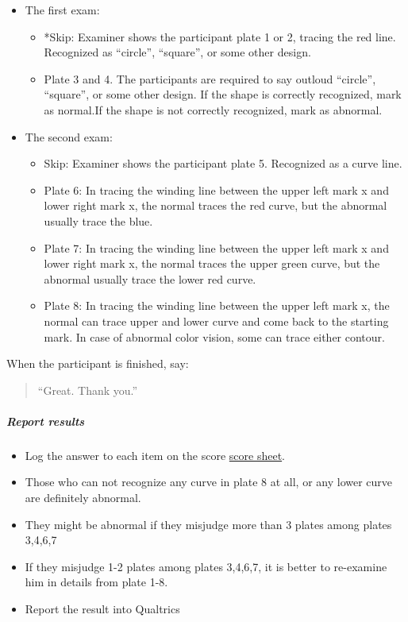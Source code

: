 \documentclass[]{article}
\providecommand{\tightlist}{%
  \setlength{\itemsep}{0pt}\setlength{\parskip}{0pt}}
\let\oldsubparagraph\subparagraph
\renewcommand{\subparagraph}[1]{\oldsubparagraph{#1}\mbox{}}
\begin{document}
\begin{itemize}
\tightlist
\item
  The first exam:

  \begin{itemize}
  \tightlist
  \item
    *Skip: Examiner shows the participant plate 1 or 2, tracing the red
    line. Recognized as ``circle'', ``square'', or some other design.
  \item
    Plate 3 and 4. The participants are required to say outloud
    ``circle'', ``square'', or some other design. If the shape is
    correctly recognized, mark as normal.If the shape is not correctly
    recognized, mark as abnormal.
  \end{itemize}
\item
  The second exam:

  \begin{itemize}
  \tightlist
  \item
    Skip: Examiner shows the participant plate 5. Recognized as a curve
    line.
  \item
    Plate 6: In tracing the winding line between the upper left mark x
    and lower right mark x, the normal traces the red curve, but the
    abnormal usually trace the blue.
  \item
    Plate 7: In tracing the winding line between the upper left mark x
    and lower right mark x, the normal traces the upper green curve, but
    the abnormal usually trace the lower red curve.
  \item
    Plate 8: In tracing the winding line between the upper left mark x,
    the normal can trace upper and lower curve and come back to the
    starting mark. In case of abnormal color vision, some can trace
    either contour.
  \end{itemize}
\end{itemize}

When the participant is finished, say:

\begin{quote}
``Great. Thank you.''
\end{quote}

\subparagraph{Report results}\label{report-results-1}

\begin{itemize}
\tightlist
\item
  Log the answer to each item on the score
  \href{vision-screening-score-sheet.html}{score sheet}.
\item
  Those who can not recognize any curve in plate 8 at all, or any lower
  curve are definitely abnormal.
\item
  They might be abnormal if they misjudge more than 3 plates among
  plates 3,4,6,7
\item
  If they misjudge 1-2 plates among plates 3,4,6,7, it is better to
  re-examine him in details from plate 1-8.
\item
  Report the result into Qualtrics
\end{itemize}
\end{document}
